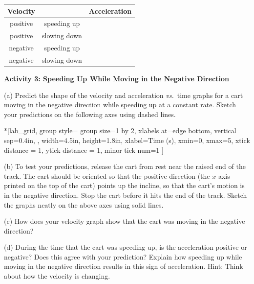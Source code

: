 \vspace{0.3cm}
{\centering \begin{tabular}{|c|c|c|}
\hline
Velocity&
&
Acceleration\\
\hline
positive&
speeding up&
\\
\hline
positive&
slowing down&
\\
\hline
negative&
speeding up&
\\
\hline
negative&
slowing down&
\\
\hline
\end{tabular}\par}
\vspace{0.3cm}


\pagebreak[2]
\textbf{Activity 3: Speeding Up While Moving in the Negative Direction} 

(a) Predict the shape of the velocity and acceleration \textit{vs.}~time graphs
for a cart moving in the negative direction while speeding up at a constant rate. Sketch your predictions on the following axes using dashed lines.

\begin{lab_groupplot}*{}[lab_grid,
	group style={
		group size=1 by 2,
		xlabels at=edge bottom,
		vertical sep=0.4in,
		},
	width=4.5in,  height=1.8in,
	xlabel=Time (s),
	xmin=0, xmax=5,
	xtick distance = 1, 
	ytick distance = 1, 
	minor tick num=1
	]
\nextgroupplot[
	ymin=-1,ymax=1, 
	ylabel={Velocity (m/s)},
	]
\nextgroupplot[
	ymin=-1,ymax=1, 
	ylabel={Acceleration (m/s$^2$)},
	]
\end{lab_groupplot}

(b) To test your predictions, release the cart from rest near the raised end of the track. The cart should be oriented so that the positive direction (the $x$-axis printed on the top of the cart) points up the incline, so that the cart's motion is in the negative direction. Stop the cart before it hits the end of the track. Sketch the graphs neatly on the above axes using solid lines.

(c) How does your velocity graph show that the cart was moving in the negative direction? 
\answerspace{20mm}

(d) During the time that the cart was speeding up, is the acceleration positive
or negative? Does this agree with your prediction? Explain how speeding up while
moving in the negative direction results in this sign of acceleration. Hint: Think
about how the velocity is changing.
\answerspace{20mm}

